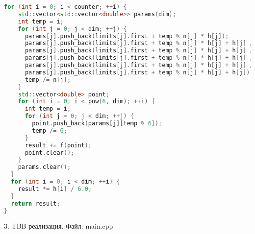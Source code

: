 \documentclass{report}
\begin{document}
\begin{lstlisting}[language=C++]
  for (int i = 0; i < counter; ++i) {
    std::vector<std::vector<double>> params(dim);
    int temp = i;
    for (int j = 0; j < dim; ++j) {
      params[j].push_back(limits[j].first + temp % n[j] * h[j]);
      params[j].push_back(limits[j].first + temp % n[j] * h[j] + h[j] / 2);
      params[j].push_back(limits[j].first + temp % n[j] * h[j] + h[j] / 2);
      params[j].push_back(limits[j].first + temp % n[j] * h[j] + h[j] / 2);
      params[j].push_back(limits[j].first + temp % n[j] * h[j] + h[j] / 2);
      params[j].push_back(limits[j].first + temp % n[j] * h[j] + h[j]);
      temp /= n[j];
    }
    std::vector<double> point;
    for (int i = 0; i < pow(6, dim); ++i) {
      int temp = i;
      for (int j = 0; j < dim; ++j) {
        point.push_back(params[j][temp % 6]);
        temp /= 6;
      }
      result += f(point);
      point.clear();
    }
    params.clear();
  }
  for (int i = 0; i < dim; ++i) {
    result *= h[i] / 6.0;
  }
  return result;
}
\end{lstlisting}

\par 3. TBB реализация. Файл: main.cpp
\end{document}
